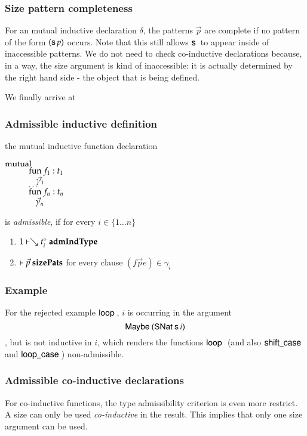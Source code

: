 \subsubsection{Size pattern completeness}
For an mutual inductive declaration $\delta$, the patterns $\vec{p}$ are complete 
if no pattern of the form $(\mathsf{s}\, p)$ occurs. 
Note that this still allows $\mathsf{s}\,$ to appear inside of inaccessible patterns.
We do not need to check co-inductive declarations because, in a way, the size argument is kind of
inaccessible: it is actually determined by the right hand side - the object that is being defined. 

We finally arrive at
\subsubsection{Admissible inductive definition}
the mutual inductive function declaration
\begin{bsp}
$\mathrm{mutual}\:$\\
$\spcx \fun f_1 : t_1 $\\
$\spcx \spc \vec{\gamma}_1$\\
$\spcx \ldots$\\
$\spcx \fun f_n : t_n $\\
$\spcx \spc \vec{\gamma}_n$
\end{bsp}
is \emph{admissible}, if  for every $i \in \{1 \ldots n \}  $
\begin{enumerate}
\item
$1\vdash\searrow t_i^{\diamond}\mbox{ \textbf{admIndType}}$
\item
$\vdash \vec{p}\mbox{ \textbf{sizePats}}$ for every clause $(f \vec{p} e) \in \gamma_i$
\end{enumerate}

\subsubsection{Example}
For the rejected example $\mathsf{loop}\:$, $i$ is occurring in the argument \[\mathsf{Maybe}\: (\mathsf{SNat}\: \mathsf{s}\, i)\], but is not inductive in $i$, which renders the functions $\mathsf{loop}\:$ (and also $ \mathsf{shift\_case}\:$ and $\mathsf{loop\_case}\:$) non-admissible.



\subsubsection{Admissible co-inductive declarations}
For co-inductive functions, the type admissibility criterion is even more restrict.
A size can only be used \emph{co-inductive} in the result.
This implies that only one size argument can be used.

